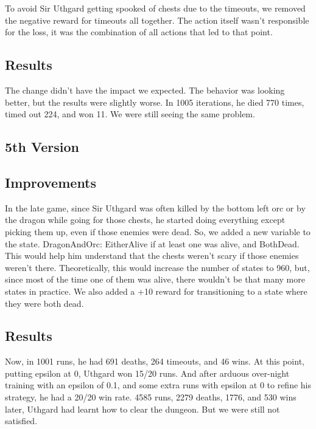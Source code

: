 \documentclass{article}
\begin{document}
  To avoid Sir Uthgard getting spooked of chests due to the timeouts, we removed the negative reward for timeouts all together. The action itself wasn't responsible for the loss, it was the combination of all actions that led to that point.  
  
  \subsection{Results}

  The change didn't have the impact we expected. The behavior was looking better, but the results were slightly worse. In 1005 iterations, he died 770 times, timed out 224, and won 11. We were still seeing the same problem.

  \subsection{5th Version}

  \subsection{Improvements}
  
  In the late game, since Sir Uthgard was often killed by the bottom left orc or by the dragon while going for those chests, he started doing everything except picking them up, even if those enemies were dead.
  So, we added a new variable to the state. DragonAndOrc: EitherAlive if at least one was alive, and BothDead. This would help him understand that the chests weren't scary if those enemies weren't there. 
  Theoretically, this would increase the number of states to 960, but, since most of the time one of them was alive, there wouldn't be that many more states in practice. 
  We also added a +10 reward for transitioning to a state where they were both dead.

  \subsection{Results}

  Now, in 1001 runs, he had 691 deaths, 264 timeouts, and 46 wins. At this point, putting epsilon at 0, Uthgard won 15/20 runs. And after arduous over-night training with an epsilon of 0.1, and some extra runs with epsilon at 0 to refine his strategy, he had a 20/20 win rate. 
  4585 runs, 2279 deaths, 1776, and 530 wins later, Uthgard had learnt how to clear the dungeon. But we were still not satisfied.
\end{document}
